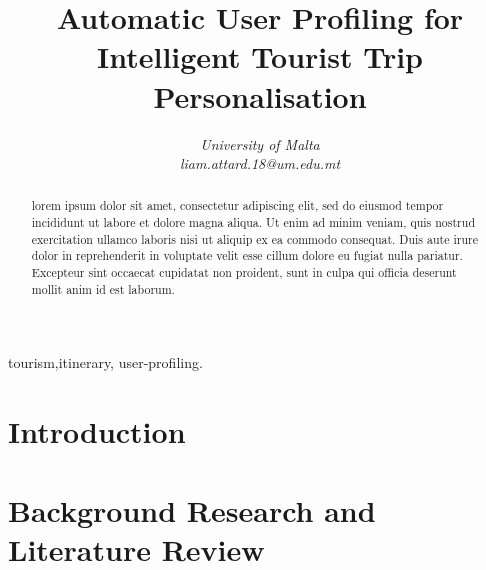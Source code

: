 \documentclass[conference]{IEEEtran}
\title{Automatic User Profiling for Intelligent Tourist Trip Personalisation}
\author{\IEEEauthorblockN{Liam Attard [0299300L] }
\IEEEauthorblockA{Department of Artificial Intelligence}
\textit{University of Malta}\\
\textit{liam.attard.18@um.edu.mt}}
\begin{document}
  \maketitle

  \begin{abstract}
    lorem ipsum dolor sit amet, consectetur adipiscing elit, sed do
    eiusmod tempor incididunt ut labore et dolore magna aliqua. Ut
    enim ad minim veniam, quis nostrud exercitation ullamco laboris
    nisi ut aliquip ex ea commodo consequat. Duis aute irure dolor in
    reprehenderit in voluptate velit esse cillum dolore eu fugiat
    nulla pariatur. Excepteur sint occaecat cupidatat non proident,
    sunt in culpa qui officia deserunt mollit anim id est laborum.
  \end{abstract}

  \begin{IEEEkeywords}
  tourism,itinerary, user-profiling.
  \end{IEEEkeywords}

  \section{Introduction}
    

  \section{Background Research and Literature Review}
    

  
  
\end{document}
